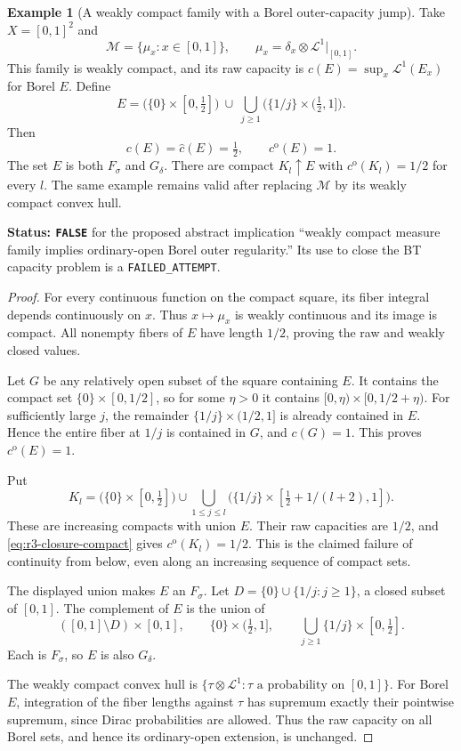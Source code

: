 \documentclass[11pt,a4paper]{article}
\numberwithin{equation}{section}
\theoremstyle{definition}
\newtheorem{example}[theorem]{Example}
\theoremstyle{remark}
\begin{document}
\begin{example}[A weakly compact family with a Borel outer-capacity jump]
\label{ex:r3-vertical-fiber-capacity}
Take $X=[0,1]^2$ and
\[
 \mathcal M=\{\mu_x:x\in[0,1]\},\qquad
 \mu_x=\delta_x\otimes\mathcal L^1|_{[0,1]}.
\]
This family is weakly compact, and its raw capacity is
$c(E)=\sup_x\mathcal L^1(E_x)$ for Borel $E$.  Define
\[
 E=\bigl(\{0\}\times[0,\tfrac12]\bigr)
    \ \cup\ \bigcup_{j\geq1}
               \bigl(\{1/j\}\times(\tfrac12,1]\bigr).
\]
Then
\[
 c(E)=\widehat c(E)=\tfrac12,
 \qquad c^{\mathrm o}(E)=1.
\]
The set $E$ is both $F_\sigma$ and $G_\delta$.  There are compact
$K_l\uparrow E$ with $c^{\mathrm o}(K_l)=1/2$ for every $l$.
The same example remains valid after replacing $\mathcal M$ by its
weakly compact convex hull.
\end{example}

\noindent\textbf{Status: \texttt{FALSE}} for the proposed abstract
implication ``weakly compact measure family implies ordinary-open
Borel outer regularity.''  Its use to close the BT capacity problem
is a \texttt{FAILED\_ATTEMPT}.

\begin{proof}
For every continuous function on the compact square, its fiber
integral depends continuously on $x$.  Thus $x\mapsto\mu_x$ is
weakly continuous and its image is compact.  All nonempty fibers
of $E$ have length $1/2$, proving the raw and weakly closed values.

Let $G$ be any relatively open subset of the square containing $E$.
It contains the compact set $\{0\}\times[0,1/2]$, so for some
$\eta>0$ it contains
$[0,\eta)\times[0,1/2+\eta)$.  For sufficiently large $j$,
the remainder $\{1/j\}\times(1/2,1]$ is already contained in $E$.
Hence the entire fiber at $1/j$ is contained in $G$, and $c(G)=1$.
This proves $c^{\mathrm o}(E)=1$.

Put
\[
 K_l=\bigl(\{0\}\times[0,\tfrac12]\bigr)
       \cup\bigcup_{1\leq j\leq l}
          \bigl(\{1/j\}\times[\tfrac12+1/(l+2),1]\bigr).
\]
These are increasing compacts with union $E$.  Their raw capacities
are $1/2$, and \eqref{eq:r3-closure-compact} gives
$c^{\mathrm o}(K_l)=1/2$.  This is the claimed failure of continuity
from below, even along an increasing sequence of compact sets.

The displayed union makes $E$ an $F_\sigma$.  Let
$D=\{0\}\cup\{1/j:j\geq1\}$, a closed subset of $[0,1]$.
The complement of $E$ is the union of
\[
 ([0,1]\setminus D)\times[0,1],\qquad
 \{0\}\times(\tfrac12,1],\qquad
 \bigcup_{j\geq1}\{1/j\}\times[0,\tfrac12].
\]
Each is $F_\sigma$, so $E$ is also $G_\delta$.

The weakly compact convex hull is
$\{\tau\otimes\mathcal L^1:\tau\text{ a probability on }[0,1]\}$.
For Borel $E$, integration of the fiber lengths against $\tau$
has supremum exactly their pointwise supremum, since Dirac
probabilities are allowed.  Thus the raw capacity on all Borel
sets, and hence its ordinary-open extension, is unchanged.
\end{proof}
\end{document}
